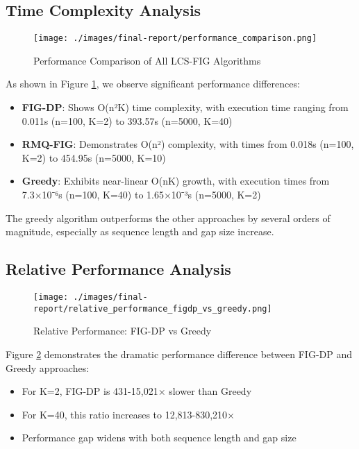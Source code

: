 \documentclass[12pt]{article}
\begin{document}
\subsection{Time Complexity Analysis}
\begin{figure}[H]
    \centering
    \texttt{[image: ./images/final-report/performance\_comparison.png]}
    \caption{Performance Comparison of All LCS-FIG Algorithms}
    \label{fig:performance_comparison}
\end{figure}

As shown in Figure \ref{fig:performance_comparison}, we observe significant performance differences:
\begin{itemize}
    \item \textbf{FIG-DP}: Shows O(n²K) time complexity, with execution time ranging from 0.011s (n=100, K=2) to 393.57s (n=5000, K=40)
    \item \textbf{RMQ-FIG}: Demonstrates O(n²) complexity, with times from 0.018s (n=100, K=2) to 454.95s (n=5000, K=10)
    \item \textbf{Greedy}: Exhibits near-linear O(nK) growth, with execution times from 7.3×10⁻⁶s (n=100, K=40) to 1.65×10⁻³s (n=5000, K=2)
\end{itemize}

The greedy algorithm outperforms the other approaches by several orders of magnitude, especially as sequence length and gap size increase.

\subsection{Relative Performance Analysis}

\begin{figure}[H]
    \centering
    \texttt{[image: ./images/final-report/relative\_performance\_figdp\_vs\_greedy.png]}
    \caption{Relative Performance: FIG-DP vs Greedy}
    \label{fig:figdp_vs_greedy}
\end{figure}

Figure \ref{fig:figdp_vs_greedy} demonstrates the dramatic performance difference between FIG-DP and Greedy approaches:
\begin{itemize}
    \item For K=2, FIG-DP is 431-15,021× slower than Greedy
    \item For K=40, this ratio increases to 12,813-830,210×
    \item Performance gap widens with both sequence length and gap size
\end{itemize}
\end{document}
